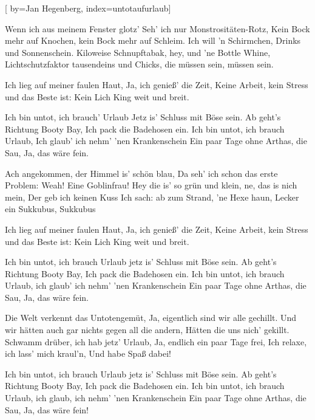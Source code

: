 
[%
    by={Jan Hegenberg},
    index={untotaufurlaub}]


    \label{untotaufurlaub}

    \beginverse
        Wenn ich aus meinem Fenster glotz'
        Seh' ich nur Monstrosit\"{a}ten-Rotz,
        Kein Bock mehr auf Knochen, kein Bock mehr auf Schleim.
        Ich will 'n Schirmchen, Drinks und Sonnenschein.
        Kiloweise Schnupftabak, hey, und 'ne Bottle Whine,
        Lichtschutzfaktor tausendeins und Chicks, die m\"{u}ssen sein, m\"{u}ssen sein.
    \endverse

    \beginverse*
        Ich lieg auf meiner faulen Haut,
        Ja, ich genie\ss{}' die Zeit,
        Keine Arbeit, kein Stress und das Beste ist:
        Kein Lich King weit und breit.
    \endverse

    \beginchorus
        Ich bin untot, ich brauch' Urlaub
        Jetz is' Schluss mit B\"{o}se sein.
        Ab geht's Richtung Booty Bay,
        Ich pack die Badehosen ein.
        Ich bin untot, ich brauch Urlaub,
        Ich glaub' ich nehm' 'nen Krankenschein
        Ein paar Tage ohne Arthas, die Sau,
        Ja, das w\"{a}re fein.
    \endchorus

    \beginverse
        Ach angekommen, der Himmel is' sch\"{o}n blau,
        Da seh' ich schon das erste Problem:
        Weah! Eine Goblinfrau!
        Hey die is' so gr\"{u}n und klein, ne, das is nich mein,
        Der geb ich keinen Kuss
        Ich sach: ab zum Strand, 'ne Hexe haun,
        Lecker ein Sukkubus, Sukkubus
    \endverse

    \beginverse*
        Ich lieg auf meiner faulen Haut,
        Ja, ich genie\ss{}' die Zeit,
        Keine Arbeit, kein Stress und das Beste ist:
        Kein Lich King weit und breit.
    \endverse

    \beginchorus
        Ich bin untot, ich brauch Urlaub
        jetz is' Schluss mit B\"{o}se sein.
        Ab geht's Richtung Booty Bay,
        Ich pack die Badehosen ein.
        Ich bin untot, ich brauch Urlaub,
        ich glaub' ich nehm' 'nen Krankenschein
        Ein paar Tage ohne Arthas, die Sau,
        Ja, das w\"{a}re fein.
    \endchorus

    \beginverse*
        Die Welt verkennt das Untotengem\"{u}t,
        Ja, eigentlich sind wir alle gechillt.
        Und wir h\"{a}tten auch gar nichts gegen all die andern,
        H\"{a}tten die uns nich' gekillt.
        Schwamm dr\"{u}ber, ich hab jetz' Urlaub,
        Ja, endlich ein paar Tage frei,
        Ich relaxe, ich lass' mich kraul'n,
        Und habe Spa\ss{} dabei!
    \endverse

    \beginchorus
        Ich bin untot, ich brauch Urlaub
        jetz is' Schluss mit B\"{o}se sein.
        Ab geht's Richtung Booty Bay,
        Ich pack die Badehosen ein.
        Ich bin untot, ich brauch Urlaub,
        ich glaub, ich nehm' 'nen Krankenschein
        Ein paar Tage ohne Arthas, die Sau,
        Ja, das w\"{a}re fein!
    \endchorus
\endsong
